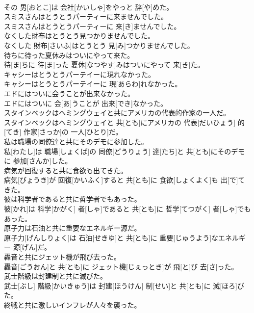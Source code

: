 \documentclass[8pt]{extreport}
\begin{document}
\begin{CJK}{UTF8}{min}
\\	その 男[おとこ]は 会社[かいしゃ]をやっと 辞[や]めた。
\\	スミスさんはとうとうパーティーに来ませんでした。	
\\	スミスさんはとうとうパーティーに 来[き]ませんでした。
\\	なくした財布はとうとう見つかりませんでした。	
\\	なくした 財布[さいふ]はとうとう 見[み]つかりませんでした。
\\	待ちに待った夏休みはついにやって来た。	
\\	待[ま]ちに 待[ま]った 夏休[なつやす]みはついにやって 来[き]た。
\\	キャシーはとうとうパーテイーに現れなかった。	
\\	キャシーはとうとうパーテイーに 現[あらわ]れなかった。
\\	エドにはついに会うことが出来なかった。	
\\	エドにはついに 会[あ]うことが 出来[でき]なかった。
\\	スタインベックはヘミングウェイと共にアメリカの代表的作家の一人だ。	
\\	スタインベックはヘミングウェイと 共[とも]にアメリカの 代表[だいひょう] 的[てき] 作家[さっか]の 一人[ひとり]だ。
\\	私は職場の同僚達と共にそのデモに参加した。	
\\	私[わたし]は 職場[しょくば]の 同僚[どうりょう] 達[たち]と 共[とも]にそのデモに 参加[さんか]した。
\\	病気が回復すると共に食欲も出てきた。	
\\	病気[びょうき]が 回復[かいふく]すると 共[とも]に 食欲[しょくよく]も 出[で]てきた。
\\	彼は科学者であると共に哲学者でもあった。	
\\	彼[かれ]は 科学[かがく] 者[しゃ]であると 共[とも]に 哲学[てつがく] 者[しゃ]でもあった。
\\	原子力は石油と共に重要なエネルギー源だ。	
\\	原子力[げんしりょく]は 石油[せきゆ]と 共[とも]に 重要[じゅうよう]なエネルギー 源[げん]だ。
\\	轟音と共にジェット機が飛び去った。	
\\	轟音[ごうおん]と 共[とも]に ジェット機[じぇっとき]が 飛[と]び 去[さ]った。
\\	武士階級は封建制と共に滅びた。	
\\	武士[ぶし] 階級[かいきゅう]は 封建[ほうけん] 制[せい]と 共[とも]に 滅[ほろ]びた。
\\	終戦と共に激しいインフレが人々を襲った。	

\end{CJK}
\end{document}
